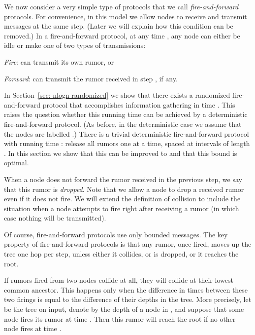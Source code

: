 





We now consider a very simple type of protocols that we call \emph{fire-and-forward} protocols.
For convenience, in this model we allow nodes to receive and transmit messages at the same step. 
(Later we will explain how this condition can be removed.) In 
a fire-and-forward protocol, at any time , any node  can either be idle or
make one of two types of transmissions:
\begin{description}
\item{\emph{Fire}:}  can transmit its own rumor, or
	\item{\emph{Forward}:}  can transmit the rumor received in step , if any.
\end{description} 
In Section~\ref{sec: nlogn randomized} we show that there exists a randomized
fire-and-forward protocol that accomplishes information gathering in time .
This raises the question whether this running time can be achieved by a
deterministic fire-and-forward protocol. 
(As before, in the deterministic case we assume that the nodes are labelled .)
There is a trivial deterministic fire-and-forward protocol with running time : release
all rumors one at a time, spaced at intervals of length . In this section we show that
this can be improved to  and that this bound is optimal.

When a node does not forward the rumor received in the previous step, we say that
this rumor is \emph{dropped}. Note that we allow a node to drop a received rumor even
if it does not fire. We will extend the definition of collision to include the
situation when a node attempts to fire right after receiving a rumor (in which case
nothing will be transmitted).

Of course, fire-and-forward protocols use only bounded messages. The key property of
fire-and-forward protocols is that any rumor, once fired,
moves up the tree one hop per step, unless either it collides, or is dropped,
or it reaches the root. 

If rumors fired from two nodes collide at all, they will collide at
their lowest common ancestor. This happens only when the
difference in times between these two firings is equal to the difference
of their depths in the tree. More precisely, let  be the tree on input,
denote by  the depth of a node  in , and suppose that some node
 fires its rumor at time . Then this rumor will reach the root if
no other node  fires at time .

